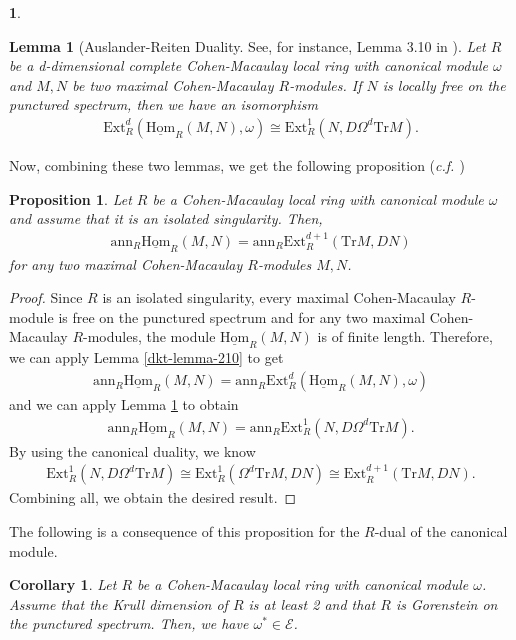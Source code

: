 \documentclass[12pt]{amsart}
\newcommand{\Ext}{\mathrm{Ext}}
\newcommand{\sHom}{\underline{\mathrm{Hom}}}
\newcommand{\ann}{\mathrm{ann}}
\newcommand{\EE}{\mathcal{E}}
\newtheorem{lemma}[theorem]{Lemma}
\newtheorem{proposition}[theorem]{Proposition}
\newtheorem{corollary}[theorem]{Corollary}
\theoremstyle{definition}
\newtheorem{chunk}[theorem]{}
\numberwithin{equation}{theorem}
\newcommand{\Tr}{\mathrm{Tr}}
\begin{document}
\begin{chunk}
\begin{lemma}[Auslander-Reiten Duality. See, for instance, Lemma 3.10 in \cite{Yoshino}]\label{ar-duality}
    Let $R$ be a d-dimensional complete Cohen-Macaulay local ring with canonical module $\omega$ and $M, N$ be two maximal Cohen-Macaulay $R$-modules. If $N$ is locally free on the punctured spectrum, then we have an isomorphism
    \begin{align*}
        \Ext_R^d(\sHom_R(M,N),\omega) \cong \Ext_R^1(N,  D\Omega^d \Tr M).
    \end{align*}
\end{lemma}
Now, combining these two lemmas, we get the following proposition (\textit{c.f. \cite[Proposition 2.11.]{Dao-Kobayashi-Takahashi}})
\begin{proposition}\label{ar-lemma-proposition}
    Let $R$ be a Cohen-Macaulay local ring with canonical module $\omega$ and assume that it is an isolated singularity. Then, 
    \begin{align*}
        \ann_R \sHom_R(M,N) = \ann_R \Ext_R^{d+1}(\Tr M, DN)
    \end{align*}
    for any two maximal Cohen-Macaulay $R$-modules $M,N$.    
\end{proposition}
\begin{proof}
    Since $R$ is an isolated singularity, every maximal Cohen-Macaulay $R$-module is free on the punctured spectrum and for any two maximal Cohen-Macaulay $R$-modules, the module $\sHom_R(M,N)$ is of finite length. Therefore, we can apply Lemma \ref{dkt-lemma-210} to get 
    \begin{align*}
        \ann_R \sHom_R(M,N) = \ann_R \Ext_R^d(\sHom_R(M,N), \omega) 
    \end{align*}
    and we can apply Lemma \ref{ar-duality} to obtain
    \begin{align*}
        \ann_R \sHom_R(M,N) = \ann_R \Ext_R^1(N,  D\Omega^d \Tr M).
    \end{align*}
    By using the canonical duality, we know 
    \begin{align*}
        \Ext_R^1(N,  D\Omega^d \Tr M) \cong \Ext_R^1(\Omega^d \Tr M, DN) \cong \Ext_R^{d+1}(\Tr M, DN).
    \end{align*}
    Combining all, we obtain the desired result.
\end{proof}
The following is a consequence of this proposition for the $R$-dual of the canonical module.
\begin{corollary}\label{the-dual-of-the-canonical-module}
    Let $R$ be a Cohen-Macaulay local ring with canonical module $\omega$. Assume that the Krull dimension of $R$ is at least 2 and that $R$ is Gorenstein on the punctured spectrum. Then, we have $\omega^* \in \EE$. 

\end{corollary}
\end{chunk}
\end{document}
